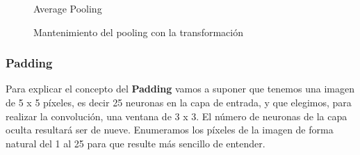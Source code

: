 \documentclass[
  a4paper,
  DIV=11,
  numbers=noendperiod]{scrreprt}
\begin{document}
\begin{figure}


\caption{\label{fig-average-pooling}Average Pooling}

\end{figure}%

\begin{figure}


\caption{\label{fig-transformacion-pooling}Mantenimiento del pooling con
la transformación}

\end{figure}%

\subsubsection{Padding}\label{padding}

Para explicar el concepto del \textbf{Padding} vamos a suponer que
tenemos una imagen de 5 x 5 píxeles, es decir 25 neuronas en la capa de
entrada, y que elegimos, para realizar la convolución, una ventana de 3
x 3. El número de neuronas de la capa oculta resultará ser de nueve.
Enumeramos los píxeles de la imagen de forma natural del 1 al 25 para
que resulte más sencillo de entender.
\end{document}

